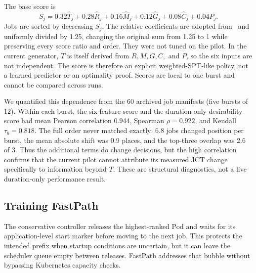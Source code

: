 \documentclass[10pt,journal,compsoc]{IEEEtran}
\begin{document}
The base score is
\begin{equation}
S_j=0.32\hat{T}_j+0.28\hat{R}_j+0.16\hat{M}_j+0.12\hat{G}_j+0.08\hat{C}_j+0.04\hat{P}_j.
\label{eq:rank}
\end{equation}
Jobs are sorted by decreasing $S_j$. The relative coefficients are adopted from~\cite{abdelshaheed2025intelligent} and uniformly divided by 1.25, changing the original sum from 1.25 to 1 while preserving every score ratio and order. They were not tuned on the pilot. In the current generator, $T$ is itself derived from $R,M,G,C,$ and $P$, so the six inputs are not independent. The score is therefore an explicit weighted-SPT-like policy, not a learned predictor or an optimality proof. Scores are local to one burst and cannot be compared across runs.

We quantified this dependence from the 60 archived job manifests (five bursts of 12). Within each burst, the six-feature score and the duration-only desirability score had mean Pearson correlation 0.944, Spearman $\rho=0.922$, and Kendall $\tau_b=0.818$. The full order never matched exactly: 6.8 jobs changed position per burst, the mean absolute shift was 0.9 places, and the top-three overlap was 2.6 of 3. Thus the additional terms do change decisions, but the high correlation confirms that the current pilot cannot attribute its measured JCT change specifically to information beyond $T$. These are structural diagnostics, not a live duration-only performance result.

\subsection{Training FastPath}

The conservative controller releases the highest-ranked Pod and waits for its application-level start marker before moving to the next job. This protects the intended prefix when startup conditions are uncertain, but it can leave the scheduler queue empty between releases. FastPath addresses that bubble without bypassing Kubernetes capacity checks.
\end{document}
